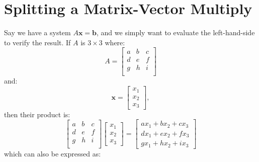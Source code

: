 \documentclass[ltr]{ornltm} %
\numberwithin{equation}{section}
\begin{document}
	\appendix
	\acresetall %


	\section{Splitting a Matrix-Vector Multiply} \label{sec:matrix-vector-multiply}
	Say we have a system $A\mathbf{x}=\mathbf{b}$, and we simply want to evaluate the left-hand-side to verify the result.
	If $A$ is $3\times 3$ where:
	\begin{equation}
		\label{eq:a-matrix}
		A = \begin{bmatrix}
				a & b & c \\
				d & e & f \\
				g & h & i \\
		\end{bmatrix}
	\end{equation}
	and:
	\begin{equation}
		\label{eq:x_vec}
		\mathbf{x} =
		\begin{bmatrix}
			x_1 \\
			x_2 \\
			x_3
		\end{bmatrix},
	\end{equation}
	then their product is:
	\begin{equation}
		\label{eq:ax-product}
		\begin{bmatrix}
			a & b & c \\
			d & e & f \\
			g & h & i \\
		\end{bmatrix}
		\begin{bmatrix}
			x_1 \\
			x_2 \\
			x_3
		\end{bmatrix}=
		\begin{bmatrix}
			ax_1+bx_2+cx_3 \\
			dx_1+ex_2+fx_3 \\
			gx_1+hx_2+ix_3
		\end{bmatrix}
	\end{equation}
	which can also be expressed as:
\end{document}

